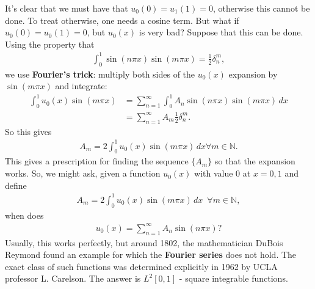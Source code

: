\documentclass{article}
\theoremstyle{definition}
\begin{document}
It's clear that we must have that $u_0(0) = u_1(1) = 0$, otherwise this cannot be done. To treat otherwise, one needs a cosine term. But what if $u_0(0) = u_0(1) = 0$, but $u_0(x)$ is very bad? Suppose that this can be done. Using the property that 
\begin{align*}
\int_{0}^1 \sin(n\pi x)\sin(m\pi x) = \frac{1}{2}\delta^m_n,
\end{align*}
we use \textbf{Fourier's trick}: multiply both sides of the $u_0(x)$ expansion by $\sin(m \pi x)$ and integrate:
\begin{align*}
\int^1_0 u_0(x)\sin(m \pi x) &= \sum_{n=1}^\infty\int_{0}^1A_n\sin(n\pi x)\sin(m \pi x)\,dx\\
&= \sum_{n=1}^\infty A_m\frac{1}{2}\delta^m_n.
\end{align*}
So this gives
\begin{align*}
A_m = 2\int^1_0 u_0(x)\sin(m\pi x)\,dx \forall m\in \mathbb{N}.
\end{align*}
This gives a prescription for finding the sequence $\{A_m \}$ so that the expansion works. So, we might ask, given a function $u_0(x)$ with value 0 at $x=0,1$ and define
\begin{align*}
A_m = 2\int^1_0 u_0(x)\sin(m\pi x)\,dx\,\,\, \forall m\in \mathbb{N},
\end{align*}
when does 
\begin{align*}
u_0(x) = \sum^\infty_{n=1}A_n \sin(n\pi x)?
\end{align*}
Usually, this works perfectly, but around 1802, the mathematician DuBois Reymond found an example for which the \textbf{Fourier series} does not hold. The exact class of such functions was determined explicitly in 1962 by UCLA professor L. Carelson. The answer is $L^2[0,1]$ - square integrable functions. \\
\end{document}
